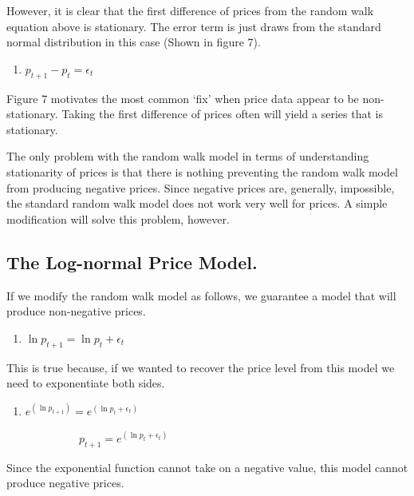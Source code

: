 \documentclass[
  letterpaper,
  DIV=11,
  numbers=noendperiod]{scrreprt}
\providecommand{\tightlist}{%
  \setlength{\itemsep}{0pt}\setlength{\parskip}{0pt}}\usepackage{longtable,booktabs,array}
\begin{document}
However, it is clear that the first difference of prices from the random
walk equation above is stationary. The error term is just draws from the
standard normal distribution in this case (Shown in figure 7).

\begin{enumerate}
\def\labelenumi{(\arabic{enumi})}
\setcounter{enumi}{3}
\tightlist
\item
  \(p_{t+1} - p_{t} = \epsilon_t\)
\end{enumerate}

Figure 7 motivates the most common `fix' when price data appear to be
non-stationary. Taking the first difference of prices often will yield a
series that is stationary.

The only problem with the random walk model in terms of understanding
stationarity of prices is that there is nothing preventing the random
walk model from producing negative prices. Since negative prices are,
generally, impossible, the standard random walk model does not work very
well for prices. A simple modification will solve this problem, however.

\hypertarget{the-log-normal-price-model.}{%
\subsection{The Log-normal Price
Model.}\label{the-log-normal-price-model.}}

If we modify the random walk model as follows, we guarantee a model that
will produce non-negative prices.

\begin{enumerate}
\def\labelenumi{(\arabic{enumi})}
\setcounter{enumi}{4}
\tightlist
\item
  \(\ln{p_{t+1}} = \ln{p_{t}} + \epsilon_t\)
\end{enumerate}

This is true because, if we wanted to recover the price level from this
model we need to exponentiate both sides.

\begin{enumerate}
\def\labelenumi{(\arabic{enumi})}
\setcounter{enumi}{5}
\tightlist
\item
  \(e^{(\ln{p_{t+1}})} = e^{(\ln{p_{t}} + \epsilon_t)}\)
\end{enumerate}

~~~~~~~~~~~~~\(p_{t+1} = e^{(\ln{p_{t}} + \epsilon_t)}\)

Since the exponential function cannot take on a negative value, this
model cannot produce negative prices.
\end{document}
